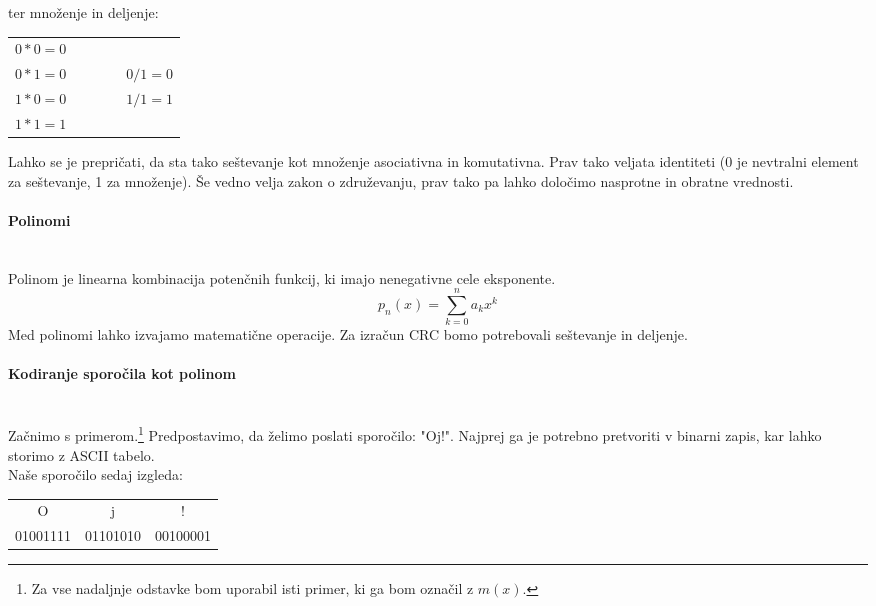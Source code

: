 \documentclass[12pt]{article}
\begin{document}
            ter množenje in deljenje:
            \begin{table}[h!]
                \centering
                \begin{tabular}{l p{0.2\linewidth}}
                    $0 * 0 = 0$  &  \\
                    $0 * 1 = 0$  & $0 / 1 = 0$\\
                    $1 * 0 = 0$  & $1 / 1 = 1$\\
                    $1 * 1 = 1$  &  \\
                \end{tabular}
            \end{table}

            Lahko se je prepričati, da sta tako seštevanje kot množenje
            asociativna in komutativna. Prav tako veljata identiteti (0 je
            nevtralni element za seštevanje, 1 za množenje). Še vedno velja zakon o združevanju, prav tako pa lahko določimo nasprotne in
            obratne vrednosti.

        \paragraph*{Polinomi} \mbox{}\\
            Polinom je linearna kombinacija potenčnih funkcij, ki imajo
            nenegativne cele eksponente.
            \begin{equation}
                p_n (x) = \sum_{k=0}^n a_kx^k
            \end{equation}
            Med polinomi lahko izvajamo matematične operacije. Za izračun
            CRC bomo potrebovali seštevanje in deljenje.

        \paragraph*{Kodiranje sporočila kot polinom} \mbox{}\\
            Začnimo s primerom.\footnote{Za vse nadaljnje odstavke bom
            uporabil isti primer, ki ga bom označil z $m(x)$.}
            Predpostavimo, da želimo poslati sporočilo: "Oj!". Najprej ga je
            potrebno pretvoriti v binarni zapis, kar lahko storimo z ASCII
            tabelo.\\
            Naše sporočilo sedaj izgleda:

            \begin{table}[h!]
                \centering
                \begin{tabular}{ccc}
                O        & j        & !        \\
                01001111 & 01101010 & 00100001
                \end{tabular}
            \end{table}
\end{document}
